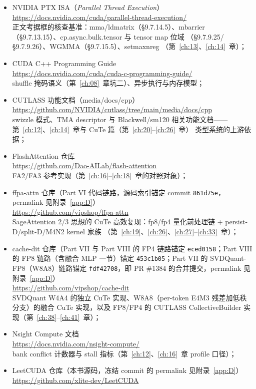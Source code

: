 \begin{itemize}
  \item NVIDIA PTX ISA（\emph{Parallel Thread Execution}）\\
        \url{https://docs.nvidia.com/cuda/parallel-thread-execution/}\\
        正文考据框的核查基准：mma/ldmatrix（§9.7.14.5）、mbarrier
        （§9.7.13.15）、cp.async.bulk.tensor 与 tensor map 位域
        （§9.7.9.25/§9.7.9.26）、WGMMA（§9.7.15.5）、setmaxnreg
        （第~\ref{ch:13}、\ref{ch:14}~章）；
  \item CUDA C++ Programming Guide\\
        \url{https://docs.nvidia.com/cuda/cuda-c-programming-guide/}\\
        shuffle 掩码语义（第~\ref{ch:08}~章坑二）、异步执行与内存模型；
  \item CUTLASS 功能文档（media/docs/cpp）\\
        \url{https://github.com/NVIDIA/cutlass/tree/main/media/docs/cpp}\\
        swizzle 模式、TMA descriptor 与 Blackwell/sm120 相关功能文档——
        第~\ref{ch:12}、\ref{ch:14}~章与 CuTe 篇（第~\ref{ch:20}--\ref{ch:26}~章）
        类型系统的上游依据；
  \item FlashAttention 仓库\\
        \url{https://github.com/Dao-AILab/flash-attention}\\
        FA2/FA3 参考实现（第~\ref{ch:16}--\ref{ch:18}~章的对照对象）；
  \item ffpa-attn 仓库（Part VI 代码链路，源码索引锚定 commit \texttt{861d75e}，
        permalink 见附录~\ref{app:D}）\\
        \url{https://github.com/vipshop/ffpa-attn}\\
        SageAttention 2/3 思想的 CuTe 高效复现：fp8/fp4 量化前处理链
        + persist-D/split-D/M4N2 kernel 家族
        （第~\ref{ch:19}、\ref{ch:26}、\ref{ch:27}--\ref{ch:33}~章）；
  \item cache-dit 仓库（Part VII 与 Part VIII 的 FP4 链路锚定
        \texttt{eced0158}；Part VIII 的 FP8 链路（含融合 MLP 一节）锚定
        \texttt{453c1b05}；Part VII 的 SVDQuant-FP8（W8A8）链路锚定
        \texttt{fdf42708}，即 PR \#1384 的合并提交，permalink 见
        附录~\ref{app:D}）\\
        \url{https://github.com/vipshop/cache-dit}\\
        SVDQuant W4A4 的独立 CuTe 实现、W8A8（per-token E4M3 残差加低秩
        分支）的融合 CuTe 实现，以及 FP8/FP4 的 CUTLASS
        CollectiveBuilder 实现（第~\ref{ch:38}--\ref{ch:41}~章）；
  \item Nsight Compute 文档\\
        \url{https://docs.nvidia.com/nsight-compute/}\\
        bank conflict 计数器与 stall 指标（第~\ref{ch:12}、\ref{ch:16}~章
        profile 口径）；
  \item LeetCUDA 仓库（本书源码，冻结 commit 的 permalink 见附录~\ref{app:D}）\\
        \url{https://github.com/xlite-dev/LeetCUDA}
\end{itemize}

